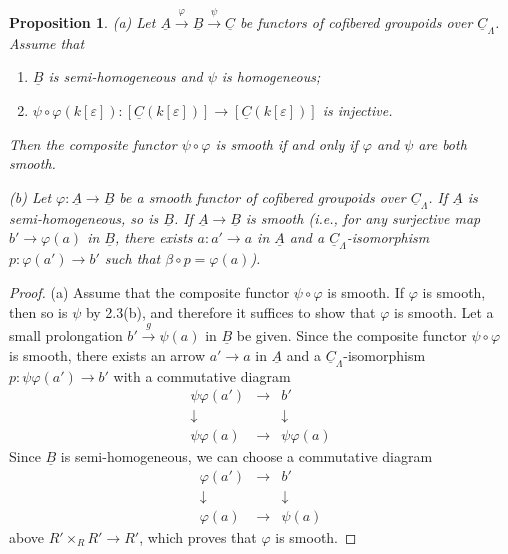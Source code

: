 \documentclass[11pt]{article}
\theoremstyle{plain}
\newtheorem{proposition}[theorem]{Proposition}
\theoremstyle{definition}
\theoremstyle{remark}
\newcommand{\uA}{\underline{A}}\newcommand{\uH}{\underline{H}}\newcommand{\uExt}{\underline{\operatorname{Ext}}}\newcommand{\uL}{\underline{L}}\newcommand{\uM}{\underline{M}}\newcommand{\uZ}{\underline{Z}}\newcommand{\uB}{\underline{B}}\newcommand{\uC}{\underline{C}}\newcommand{\uD}{\underline{D}}\newcommand{\uE}{\underline{E}}\newcommand{\uG}{\underline{G}}\newcommand{\uP}{\underline{P}}\newcommand{\uQ}{\underline{Q}}
\begin{document}
\begin{proposition}
\textup{(a)} Let $\uA \xrightarrow{\varphi} \uB \xrightarrow{\psi} \uC$ be functors of cofibered groupoids over $\underline{C}_{\Lambda}$. Assume that
\begin{enumerate}
\item[(i)] $\uB$ is semi-homogeneous and $\psi$ is homogeneous;
\item[(ii)] $\psi \circ \varphi(k[\varepsilon]) : [\uC(k[\varepsilon])] \longrightarrow [\uC(k[\varepsilon])]$ is injective.
\end{enumerate}
Then the composite functor $\psi \circ \varphi$ is smooth if and only if $\varphi$ and $\psi$ are both smooth.

\textup{(b)} Let $\varphi : \uA \to \uB$ be a smooth functor of cofibered groupoids over $\underline{C}_{\Lambda}$. If $\uA$ is semi-homogeneous, so is $\uB$. If $\uA \to \uB$ is smooth (i.e., for any surjective map $b' \to \varphi(a)$ in $\uB$, there exists $a : a' \to a$ in $\uA$ and a $\underline{C}_{\Lambda}$-isomorphism $p : \varphi(a') \to b'$ such that $\beta \circ p = \varphi(a)$).
\end{proposition}

\begin{proof}
(a) Assume that the composite functor $\psi \circ \varphi$ is smooth. If $\varphi$ is smooth, then so is $\psi$ by 2.3(b), and therefore it suffices to show that $\varphi$ is smooth. Let a small prolongation $b' \xrightarrow{g} \psi(a)$ in $\uB$ be given. Since the composite functor $\psi \circ \varphi$ is smooth, there exists an arrow $a' \to a$ in $\uA$ and a $\underline{C}_{\Lambda}$-isomorphism $p : \psi\varphi(a') \to b'$ with a commutative diagram
\[
\begin{array}{ccc}
\psi\varphi(a') & \longrightarrow & b' \\
\downarrow & & \downarrow \\
\psi\varphi(a) & \longrightarrow & \psi\varphi(a)
\end{array}
\]
Since $\uB$ is semi-homogeneous, we can choose a commutative diagram
\[
\begin{array}{ccc}
\varphi(a') & \longrightarrow & b' \\
\downarrow & & \downarrow \\
\varphi(a) & \longrightarrow & \psi(a)
\end{array}
\]
above $R' \times_R R' \to R'$, which proves that $\varphi$ is smooth.
\end{proof}
\end{document}
